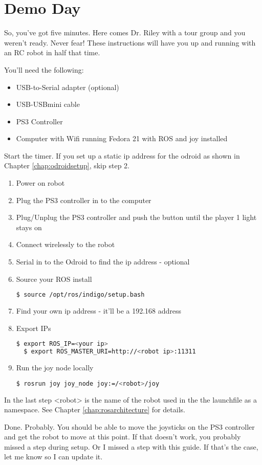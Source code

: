 
\chapter{Demo Day}
\label{chap:demoday}

So, you've got five minutes. Here comes Dr. Riley with a tour group and you weren't ready. Never fear! These instructions will have you up and running with an RC robot in half that time.

You'll need the following:

\begin{itemize}
\item{USB-to-Serial adapter (optional)}
\item{USB-USBmini cable}
\item{PS3 Controller}
\item{Computer with Wifi running Fedora 21 with ROS and joy installed}
\end{itemize}

Start the timer. If you set up a static ip address for the odroid as shown in Chapter \ref{chap:odroidsetup}, skip step 2.
\begin{enumerate}
\item{Power on robot}
\item{Plug the PS3 controller in to the computer}
\item{Plug/Unplug the PS3 controller and push the button until the player 1 light stays on}
\item{Connect wirelessly to the robot}
\item{Serial in to the Odroid to find the ip address - optional}
\item{Source your ROS install}
\begin{lstlisting}[language=bash]
  $ source /opt/ros/indigo/setup.bash
\end{lstlisting}
\item{Find your own ip address - it'll be a 192.168 address}
\item{Export IPs}
\begin{lstlisting}[language=bash]
  $ export ROS_IP=<your ip>
  $ export ROS_MASTER_URI=http://<robot ip>:11311
\end{lstlisting}
\item{Run the joy node locally}
\begin{lstlisting}[language=bash]
  $ rosrun joy joy_node joy:=/<robot>/joy
\end{lstlisting}
\end{enumerate}

In the last step <robot> is the name of the robot used in the the launchfile as a namespace. See Chapter \ref{chap:rosarchitecture} for details.

Done. Probably. You should be able to move the joysticks on the PS3 controller and get the robot to move at this point. If that doesn't work, you probably missed a step during setup. Or I missed a step with this guide. If that's the case, let me know so I can update it.